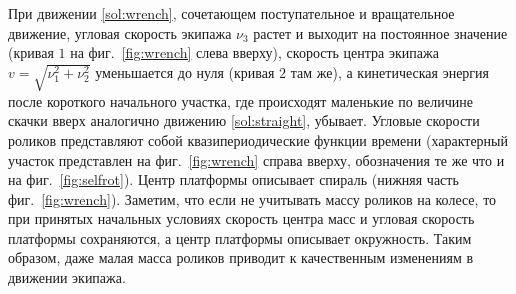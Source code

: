 При движении \ref{sol:wrench}, сочетающем поступательное и вращательное движение, угловая скорость экипажа $\nu_3$ растет и выходит на постоянное значение (кривая $1$ на фиг.~\ref{fig:wrench} слева вверху), скорость центра экипажа $v = \sqrt{\nu_1^2+\nu_2^2}$ уменьшается до нуля (кривая $2$ там же), а кинетическая энергия после короткого начального участка, где происходят маленькие по величине скачки вверх аналогично движению \ref{sol:straight}, убывает. Угловые скорости роликов представляют собой квазипериодические функции времени (характерный участок представлен на фиг.~\ref{fig:wrench} справа вверху, обозначения те же что и на фиг.~\ref{fig:selfrot}). Центр платформы описывает спираль (нижняя часть фиг.~\ref{fig:wrench}). Заметим, что если не учитывать массу роликов на колесе, то при принятых начальных условиях скорость центра масс и угловая скорость платформы сохраняются, а центр платформы описывает окружность. Таким образом, даже малая масса роликов приводит к качественным изменениям в движении экипажа.


